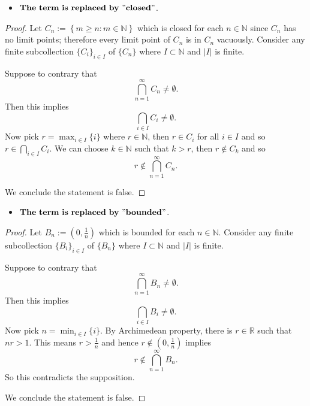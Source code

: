 \begin{Exercise}
	\begin{itemize}
		\item $\mathbf{The\ term\ is\ replaced\ by\ "closed"}$.
	\end{itemize}
	\begin{proof}
		Let $C_n := \left\{m\geq n:m\in\mathbb{N}\right\}$ which is closed for each $n\in\mathbb{N}$ since $C_n$ has no limit points; therefore every limit point of $C_n$ is in $C_n$ vacuously. Consider any finite subcollection $\{C_i\}_{i\in I}$ of $\{C_n\}$ where $I\subset \mathbb{N}$ and $|I|$ is finite.
		
		Suppose to contrary that
		$$
		\bigcap_{n=1}^{\infty} C_n \neq \emptyset.
		$$
		Then this implies
		$$
		\bigcap_{i\in I} C_i \neq \emptyset.
		$$
		Now pick $r = \max_{i\in I}\{i\}$ where $r\in\mathbb{N}$, then $r\in C_i$ for all $i\in I$ and so $r\in \bigcap_{i\in I}C_i$. We can choose $k\in\mathbb{N}$ such that $k>r$, then $r\notin C_k$ and so
		$$
		r \notin \bigcap_{n=1}^{\infty}C_n.
		$$
		
		We conclude the statement is false.
	\end{proof}
	
	\begin{itemize}
		\item $\mathbf{The\ term\ is\ replaced\ by\ "bounded"}$.
	\end{itemize}
	\begin{proof}
		Let $B_n := \left(0,\frac{1}{n}\right)$ which is bounded for each $n\in\mathbb{N}$. Consider any finite subcollection $\{B_i\}_{i\in I}$ of $\{B_n\}$ where $I\subset \mathbb{N}$ and $|I|$ is finite.
		
		Suppose to contrary that
		$$
		\bigcap_{n=1}^{\infty} B_n \neq \emptyset.
		$$
		Then this implies
		$$
		\bigcap_{i\in I} B_i \neq \emptyset.
		$$
		Now pick $n = \min_{i\in I}\{i\}$. By Archimedean property, there is $r\in\mathbb{R}$ such that $n r > 1$. This means $r>\frac{1}{n}$ and hence $r\notin\left(0, \frac{1}{n} \right)$ implies
		$$
		r\notin \bigcap_{n=1}^{\infty} B_n.
		$$
		So this contradicts the supposition.
		
		We conclude the statement is false.
	\end{proof}
\end{Exercise}